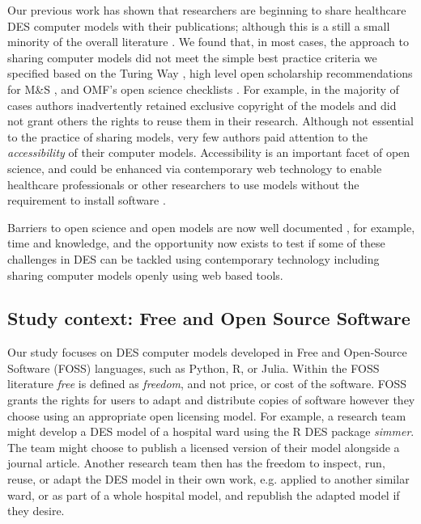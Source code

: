 \documentclass[]{interact}
\theoremstyle{plain}%
\theoremstyle{definition}
\theoremstyle{remark}
\begin{document}
Our previous work has shown that researchers are beginning to share healthcare DES computer models with their publications; although this is a still a small minority of the overall literature \citep{monks2023computer}. We found that, in most cases, the approach to sharing computer models did not meet the simple best practice criteria we specified based on the Turing Way \citep{the_turing_way_community_2022_7470333}, high level open scholarship recommendations for M\&S \citep{taylor2017open}, and OMF's open science checklists \citep{omf}. For example, in the majority of cases authors inadvertently retained exclusive copyright of the models and did not grant others the rights to reuse them in their research. Although not essential to the practice of sharing models, very few authors paid attention to the \textit{accessibility} of their computer models.  Accessibility is an important facet of open science, and could be enhanced via contemporary web technology to enable healthcare professionals or other researchers to use models without the requirement to install software \citep{shiney_paper, wojciechowski2015interactive,dagkakis2016review, harper_monks_manzi_2023}.


Barriers to open science and open models are now well documented \citep{Allen2019, Zecevic2021, gomes2022don}, for example, time and knowledge, and the opportunity now exists to test if some of these challenges in DES can be tackled using contemporary technology including sharing computer models openly using web based tools.



\subsection{Study context: Free and Open Source Software}

Our study focuses on DES computer models developed in Free and Open-Source Software (FOSS) languages, such as Python, R, or Julia. Within the FOSS literature \textit{free} is defined as \textit{freedom}, and not price, or cost of the software. FOSS grants the rights for users to adapt and distribute copies of software however they choose using an appropriate open licensing model. For example, a research team might develop a DES model of a hospital ward using the R DES package \textit{simmer}. The team might choose to publish a licensed version of their model alongside a journal article. Another research team then has the freedom to inspect, run, reuse, or adapt the DES model in their own work, e.g. applied to another similar ward, or as part of a whole hospital model, and republish the adapted model if they desire.
\end{document}
